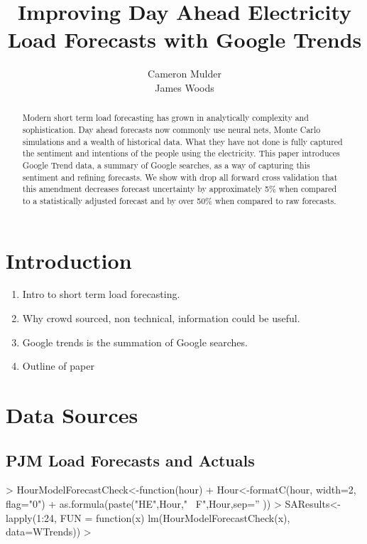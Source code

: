 \documentclass{article}
\title{Improving Day Ahead Electricity Load Forecasts with Google Trends}
\author{Cameron Mulder\\ James Woods}
\begin{document}
\maketitle
{}


\begin{abstract}
Modern short term load forecasting has grown in analytically complexity and sophistication.  Day ahead forecasts now commonly use neural nets, Monte Carlo simulations and a wealth of historical data.  What they have not done is fully captured the sentiment and intentions of the people using the electricity.  This paper introduces Google Trend data, a summary of Google searches, as a way of capturing this sentiment and refining forecasts.  We show with drop all forward cross validation that this amendment decreases forecast uncertainty by approximately 5\% when compared to a statistically adjusted forecast and by over 50\% when compared to raw forecasts.
\end{abstract}



\section{Introduction}



\begin{enumerate}
  \item Intro to short term load forecasting.
  \item Why crowd sourced, non technical,  information could be useful.
  \item Google trends is the summation of Google searches.
  \item Outline of paper
\end{enumerate}


\section{Data Sources}

  \subsection{PJM Load Forecasts and Actuals}
  
  
\begin{Schunk}
\begin{Sinput}
> HourModelForecastCheck<-function(hour){
+   Hour<-formatC(hour, width=2, flag="0")
+   as.formula(paste("HE",Hour,"~ F",Hour,sep='' ))}
> SAResults<-lapply(1:24, FUN = function(x)  lm(HourModelForecastCheck(x), data=WTrends))
> 
\end{Sinput}
\end{Schunk}
\end{document}
